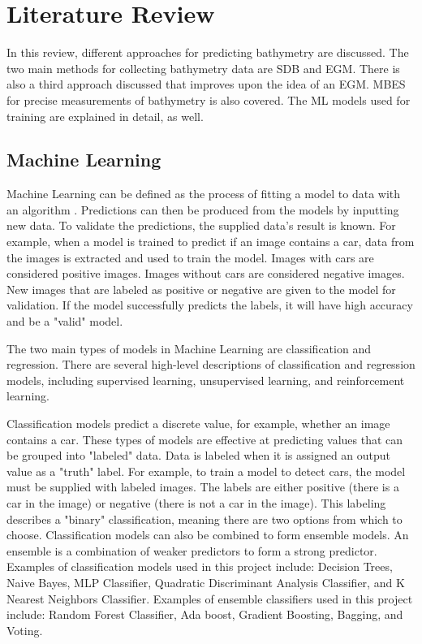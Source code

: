 \section{Literature Review}
\setlength{\parindent}{10ex}
In this review, different approaches for predicting bathymetry are discussed.
The two main methods for collecting bathymetry data are \acf{SDB} and \acf{EGM}.
There is also a third approach discussed that improves upon the idea of an \ac{EGM}.
\acf{MBES} for precise measurements of bathymetry \cite{farr1980multibeam} is also covered.
The \acf{ML} models used for training are explained in detail, as well.

\subsection{Machine Learning}
Machine Learning can be defined as the process of fitting a model to data with an algorithm \cite{bishop2006pattern}.
Predictions can then be produced from the models by inputting new data.
To validate the predictions, the supplied data's result is known.
For example, when a model is trained to predict if an image contains a car, data from the images is extracted and used to train the model.
Images with cars are considered positive images.
Images without cars are considered negative images.
New images that are labeled as positive or negative are given to the model for validation.
If the model successfully predicts the labels, it will have high accuracy and be a "valid" model.

\par
The two main types of models in Machine Learning are classification and regression.
There are several high-level descriptions of classification and regression models, including supervised learning, unsupervised learning, and reinforcement learning.

\par
Classification models predict a discrete value, for example, whether an image contains a car.
These types of models are effective at predicting values that can be grouped into "labeled" data.
Data is labeled when it is assigned an output value as a "truth" label.
For example, to train a model to detect cars, the model must be supplied with labeled images. 
The labels are either positive (there is a car in the image) or negative (there is not a car in the image).
This labeling describes a "binary" classification, meaning there are two options from which to choose.
Classification models can also be combined to form ensemble models.
An ensemble is a combination of weaker predictors to form a strong predictor.
Examples of classification models used in this project include: Decision Trees, Naive Bayes, MLP Classifier, Quadratic Discriminant Analysis Classifier, and K Nearest Neighbors Classifier.
Examples of ensemble classifiers used in this project include: Random Forest Classifier, Ada boost, Gradient Boosting, Bagging, and Voting.

